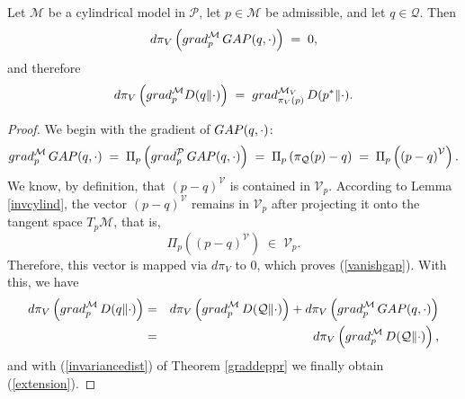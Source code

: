 \documentclass[10pt,a4paper]{amsart}
\begin{document}
\begin{theorem} \label{mainthdist}
Let ${\mathcal M}$ be a cylindrical model in ${\mathcal P}$, let $p \in {\mathcal M}$ be admissible, and let $q \in {\mathcal Q}$. Then
\begin{equation}  
 d\pi_V \left( {\rm grad}^{{\mathcal M}}_p \, 
   {\rm GAP}(q, \cdot ) \right) 
   \; = \; 0, \label{vanishgap} 
\end{equation}
and therefore 
\begin{equation} 
   d\pi_V \left( {\rm grad}^{{\mathcal M}}_p 
   D(q \| \cdot ) \right) 
           \; = \;  {\rm grad}_{\pi_V(p)}^{{\mathcal M}_V} \, D(p^\ast \| \cdot). \label{extension}
\end{equation}  
\end{theorem} 

\begin{proof} 
We begin with the gradient of ${\rm GAP}(q,\cdot)$:
\begin{equation*}
  {\rm grad}^{{\mathcal M}}_p \, {\rm GAP}(q, \cdot ) 
        \; = \; \Pi_p \left( {\rm grad}^{{\mathcal P}}_p \,
        {\rm GAP}(q,\cdot ) \right) 
        \; = \; \Pi_p \left( 
        \pi_{\mathcal Q}(p) - q
        \right) 
        \; = \;  \Pi_p \left( {(p - q)}^{\mathcal V} \right). 
\end{equation*}
We know, by definition, that 
${(p - q)}^{\mathcal V}$ is contained in ${\mathcal V}_p$. 
According to Lemma \ref{invcylind}, the vector ${(p - q)}^{\mathcal V}$ remains in  ${\mathcal V}_p$ after projecting it onto the tangent space $T_p {\mathcal M}$, that is,  
\[
   \Pi_p \left( {(p - q)}^{\mathcal V} \right) \; \in \; {\mathcal V}_p. 
\]
Therefore, this vector is mapped via $d\pi_V$ to $0$, which proves 
(\ref{vanishgap}). 
With this, we have   
\begin{eqnarray*}
  d\pi_V \left( {\rm grad}^{{\mathcal M}}_p \, D(q \| \cdot ) \right)  
        & = & 
   d\pi_V \left( {\rm grad}^{{\mathcal M}}_p \, 
   D({\mathcal Q} \| \cdot ) \right) +   
   d\pi_V \left( {\rm grad}^{{\mathcal M}}_p \, 
   {\rm GAP}(q, \cdot )\right) \\
   & = & d\pi_V \left( {\rm grad}^{{\mathcal M}}_p \, 
   D({\mathcal Q} \| \cdot ) \right), 
\end{eqnarray*}
and with (\ref{invariancedist}) of Theorem  \ref{graddeppr} 
we finally obtain (\ref{extension}).
\end{proof}
\end{document}
